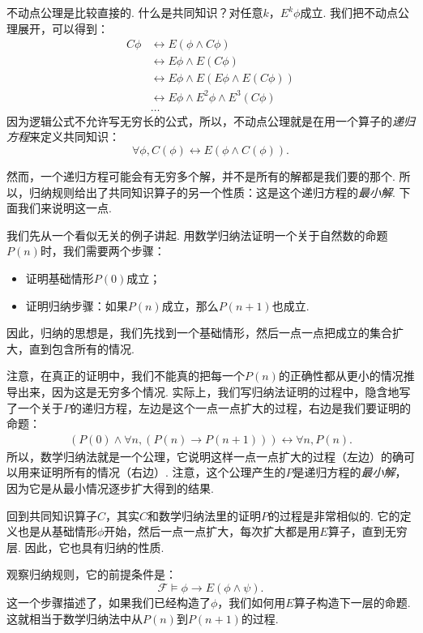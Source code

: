 不动点公理是比较直接的. 什么是共同知识？对任意$k$，$E^k\phi$成立. 我们把不动点公理展开，可以得到：
\begin{align*}
    C\phi&\leftrightarrow E(\phi\wedge C\phi)\\
    &\leftrightarrow E\phi\wedge E(C\phi)\\
    &\leftrightarrow E\phi\wedge E(E\phi\wedge E(C\phi))\\
    &\leftrightarrow E\phi\wedge E^2\phi\wedge E^3(C\phi)\\
    &\dots
\end{align*}
因为逻辑公式不允许写无穷长的公式，所以，不动点公理就是在用一个算子的\textit{递归方程}来定义共同知识：
\[\forall\phi,C(\phi)\leftrightarrow E(\phi\wedge C(\phi)). \]

然而，一个递归方程可能会有无穷多个解，并不是所有的解都是我们要的那个. 所以，归纳规则给出了共同知识算子的另一个性质：这是这个递归方程的\textit{最小解}. 下面我们来说明这一点. 

我们先从一个看似无关的例子讲起. 用数学归纳法证明一个关于自然数的命题$P(n)$时，我们需要两个步骤：
\begin{itemize}
    \item 证明基础情形$P(0)$成立；
    \item 证明归纳步骤：如果$P(n)$成立，那么$P(n+1)$也成立. 
\end{itemize}
因此，归纳的思想是，我们先找到一个基础情形，然后一点一点把成立的集合扩大，直到包含所有的情况. 

注意，在真正的证明中，我们不能真的把每一个$P(n)$的正确性都从更小的情况推导出来，因为这是无穷多个情况. 实际上，我们写归纳法证明的过程中，隐含地写了一个关于$P$的递归方程，左边是这个一点一点扩大的过程，右边是我们要证明的命题：
\begin{align*}
    (P(0)\wedge\forall n,(P(n)\to P(n+1)))\leftrightarrow\forall n,P(n).
\end{align*}
所以，数学归纳法就是一个公理，它说明这样一点一点扩大的过程（左边）的确可以用来证明所有的情况（右边）. 注意，这个公理产生的$P$是递归方程的\textit{最小解}，因为它是从最小情况逐步扩大得到的结果. 

回到共同知识算子$C$，其实$C$和数学归纳法里的证明$P$的过程是非常相似的. 它的定义也是从基础情形$\phi$开始，然后一点一点扩大，每次扩大都是用$E$算子，直到无穷层. 因此，它也具有归纳的性质. 

观察归纳规则，它的前提条件是：
\[\mathcal F\vDash \phi\to E(\phi\wedge\psi).\]
这一个步骤描述了，如果我们已经构造了$\phi$，我们如何用$E$算子构造下一层的命题. 这就相当于数学归纳法中从$P(n)$到$P(n+1)$的过程. 

